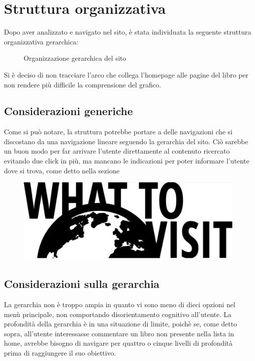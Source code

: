 \section{Struttura organizzativa}\label{sec:struttura-org}
Dopo aver analizzato e navigato nel sito, è stata individuata la seguente
struttura organizzativa gerarchica:
\begin{figure}[h!]
    \centering
    \scalebox{.7}{}
    \caption{Organizzazione gerarchica del sito}
    \label{fig:gerarchia}
\end{figure}

Si è deciso di non tracciare l'arco che collega l'homepage alle pagine del
libro per non rendere più difficile la comprensione del grafico.

\subsection{Considerazioni generiche}
Come si può notare, la struttura potrebbe portare a delle navigazioni che si
discostano da una navigazione lineare seguendo la gerarchia del sito.
Ciò sarebbe un buon modo per far arrivare l'utente direttamente al contenuto
ricercato evitando due click in più, ma mancano le indicazioni per poter informare l'utente dove si trova, come detto nella sezione %

  \begin{figure}[h!]
  \centering
  \includegraphics{images/WTV_logo.jpg}
  \end{figure}

\subsection{Considerazioni sulla gerarchia}
La gerarchia non è troppo ampia in quanto vi sono meno di dieci opzioni nel
menù principale, non comportando disorientamento cognitivo all'utente.
La profondità della gerarchia è in una situazione di limite,
poichè se, come detto sopra, all'utente interessasse commentare un libro non
presente nella lista in home, avrebbe bisogno di navigare per quattro o cinque
livelli di profondità prima di raggiungere il suo obiettivo.

